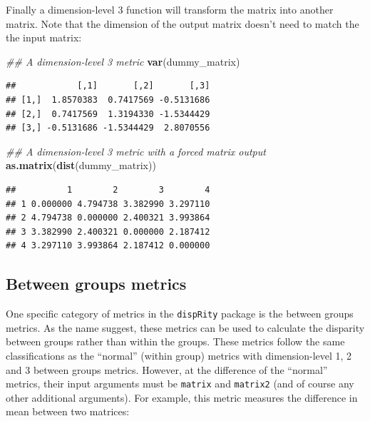 \documentclass[
]{book}
\newenvironment{Shaded}{\begin{snugshade}}{\end{snugshade}}
\newcommand{\CommentTok}[1]{\textcolor[rgb]{0.56,0.35,0.01}{\textit{#1}}}
\newcommand{\KeywordTok}[1]{\textcolor[rgb]{0.13,0.29,0.53}{\textbf{#1}}}
\newcommand{\NormalTok}[1]{#1}
\begin{document}
Finally a dimension-level 3 function will transform the matrix into another matrix.
Note that the dimension of the output matrix doesn't need to match the the input matrix:

\begin{Shaded}
\begin{Highlighting}[]
\CommentTok{\#\# A dimension{-}level 3 metric}
\KeywordTok{var}\NormalTok{(dummy\_matrix)}
\end{Highlighting}
\end{Shaded}

\begin{verbatim}
##            [,1]       [,2]       [,3]
## [1,]  1.8570383  0.7417569 -0.5131686
## [2,]  0.7417569  1.3194330 -1.5344429
## [3,] -0.5131686 -1.5344429  2.8070556
\end{verbatim}

\begin{Shaded}
\begin{Highlighting}[]
\CommentTok{\#\# A dimension{-}level 3 metric with a forced matrix output}
\KeywordTok{as.matrix}\NormalTok{(}\KeywordTok{dist}\NormalTok{(dummy\_matrix))}
\end{Highlighting}
\end{Shaded}

\begin{verbatim}
##          1        2        3        4
## 1 0.000000 4.794738 3.382990 3.297110
## 2 4.794738 0.000000 2.400321 3.993864
## 3 3.382990 2.400321 0.000000 2.187412
## 4 3.297110 3.993864 2.187412 0.000000
\end{verbatim}

\hypertarget{betweengroupmetricsexplain}{%
\subsection{Between groups metrics}\label{betweengroupmetricsexplain}}

One specific category of metrics in the \texttt{dispRity} package is the between groups metrics.
As the name suggest, these metrics can be used to calculate the disparity between groups rather than within the groups.
These metrics follow the same classifications as the ``normal'' (within group) metrics with dimension-level 1, 2 and 3 between groups metrics.
However, at the difference of the ``normal'' metrics, their input arguments must be \texttt{matrix} and \texttt{matrix2} (and of course any other additional arguments).
For example, this metric measures the difference in mean between two matrices:
\end{document}
